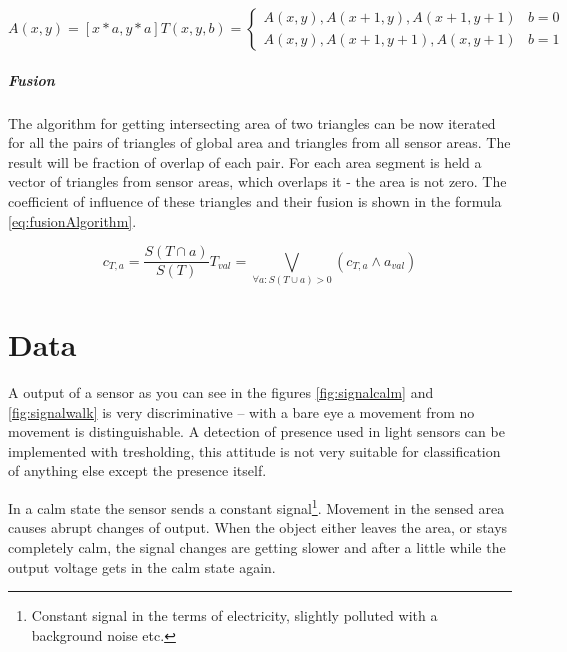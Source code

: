 \begin{subequations}
\begin{equation}
A(x,y) = [x*a, y*a]
\end{equation}
\begin{equation}
T(x,y,b) = \begin{cases}  {A(x,y), A(x+1,y), A(x+1,y+1)} & b = 0 \\
                          {A(x,y), A(x+1,y+1), A(x,y+1)} & b = 1
           \end{cases}
\end{equation}
\label{eq:globalArea}
\end{subequations}

\paragraph{Fusion}
The algorithm for getting intersecting area of two triangles can be now iterated for all the
pairs of triangles of global area and triangles from all sensor areas. The result will be
fraction of overlap of each pair. For each area segment is held a vector of triangles from
sensor areas, which overlaps it - the area is not zero. The coefficient of influence of these
triangles and their fusion is shown in the formula \ref{eq:fusionAlgorithm}.


\begin{subequations}
\begin{equation}
c_{T,a} = \frac{S(T \cap a)}{S(T)}
\end{equation}
\begin{equation}
T_{val} = \bigvee\limits_{\forall a: S(T \cup a) > 0}{} (c_{T,a} \land a_{val})
\end{equation}
\label{eq:fusionAlgorithm}
\end{subequations}




\chapter{Data}

A output of a sensor as you can see in the figures \ref{fig:signalcalm} and \ref{fig:signalwalk}
is very discriminative -- with a bare eye a movement from no movement is distinguishable.
A detection of presence used in light sensors can be implemented with tresholding, this attitude is
not very suitable for classification of anything else except the presence itself.

In a calm state the sensor sends a constant signal\footnote{Constant signal in the terms
of electricity, slightly polluted with a background noise etc.}. Movement in the sensed area causes
abrupt changes of output. When the object either leaves the area, or stays completely calm, the signal
changes are getting slower and after a little while the output voltage gets in the calm state again.

